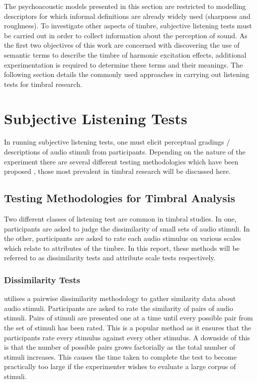 		The psychoacoustic models presented in this section are restricted to modelling descriptors for which
		informal definitions are already widely used (sharpness and roughness). To investigate other aspects of
		timbre, subjective listening tests must be carried out in order to collect information about the perception
		of sound. As the first two objectives of this work are concerned with discovering the use of semantic terms
		to describe the timbre of harmonic excitation effects, additional experimentation is required to determine
		these terms and their meanings. The following section details the commonly used approaches in carrying out
		listening tests for timbral research.
		
\section{Subjective Listening Tests}
\label{sec:Timbre-ListeningTests}
	In running subjective listening tests, one must elicit perceptual gradings / descriptions of audio stimuli from
	participants. Depending on the nature of the experiment there are several different testing methodologies which
	have been proposed \citep{bech2006perceptual}, those most prevalent in timbral research will be discussed here.

	\subsection{Testing Methodologies for Timbral Analysis}
	\label{sec:Timbre-ListeningTests-Methods}
		Two different classes of listening test are common in timbral studies. In one, participants are asked to
		judge the dissimilarity of small sets of audio stimuli. In the other, participants are asked to rate each
		audio stimulus on various scales which relate to attributes of the timbre. In this report, these methods
		will be referred to as dissimilarity tests and attribute scale tests respectively.

		\subsubsection*{Dissimilarity Tests}
			\citet{grey1977multidimensional} utilises a pairwise dissimilarity methodology to gather similarity
			data about audio stimuli. Participants are asked to rate the similarity of pairs of audio stimuli.
			Pairs of stimuli are presented one at a time until every possible pair from the set of stimuli has
			been rated. This is a popular method as it ensures that the participants rate every stimulus
			against every other stimulus. A downside of this is that the number of possible pairs grows
			factorially as the total number of stimuli increases. This causes the time taken to complete the
			test to become practically too large if the experimenter wishes to evaluate a large corpus of
			stimuli.

